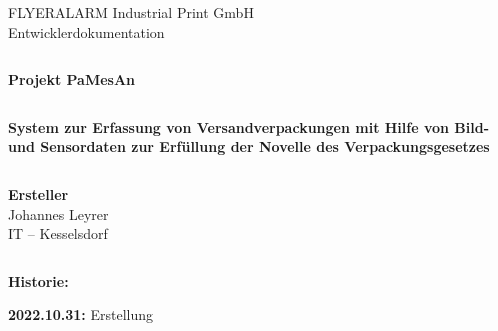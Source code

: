 \documentclass[
  a4paper,
  11pt,
  headings=small,
  ngerman,
  listof=totoc,
  numbers=noenddot,
  parskip=half,
  toc=flat
  ]{scrartcl}[2021/11/13]
\begin{document}
\appendix
{}



\newpage

\pagestyle{empty}

\begin{verbatim}

\end{verbatim}
\begin{center}
  {\Large FLYERALARM Industrial Print GmbH} \\
  \vspace{0.3cm}
  {\LARGE Entwicklerdokumentation}
\end{center}
\begin{verbatim}

\end{verbatim}
\begin{center}
  {\huge \textbf{Projekt PaMesAn}}
\end{center}
\begin{verbatim}

\end{verbatim}
\begin{center}
  {\Large \textbf{System zur Erfassung von Versandverpackungen mit Hilfe von Bild- und Sensordaten zur Erfüllung der Novelle des Verpackungsgesetzes}}
\end{center}
\begin{verbatim}

\end{verbatim}

\begin{center}
  \textbf{\large{Ersteller}} \\
  {\large Johannes Leyrer} \\
  {\large IT -- Kesselsdorf}
\end{center}
\begin{verbatim}

\end{verbatim}

\vspace*{\fill}

\textbf{Historie:}

\begin{addmargin}{1cm}
  \textbf{2022.10.31:} Erstellung
\end{addmargin}

\newpage

\pagestyle{scrheadings}
\setcounter{page}{1}
\renewcommand{\thepage}{B-\arabic{page}}

\end{document}

